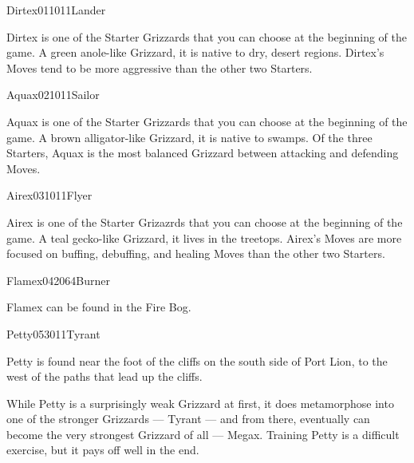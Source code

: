 \documentclass[10pt,twocolumn]{memoir}
\begin{document}
\begin{grizzardpage}{Dirtex}{01}{10}{1}{1}{Lander}

  Dirtex  is one  of the  Starter  Grizzards that  you can  choose at  the
  beginning of the game. A green anole-like Grizzard, it is native to dry,
  desert regions. Dirtex's Moves tend to be more aggressive than the other
  two Starters.

\end{grizzardpage}

\begin{grizzardpage}{Aquax}{02}{10}{1}{1}{Sailor}

  Aquax  is one  of  the Starter  Grizzards  that you  can  choose at  the
  beginning of the game. A brown  alligator-like Grizzard, it is native to
  swamps.  Of the  three Starters,  Aquax  is the  most balanced  Grizzard
  between attacking and defending Moves.

\end{grizzardpage}

\begin{grizzardpage}{Airex}{03}{10}{1}{1}{Flyer}

Airex  is one  of  the Starter  Grizazrds  that you  can  choose at  the
beginning  of  the  game.  A  teal  gecko-like  Grizzard,  it  lives  in
the treetops. Airex's Moves are  more focused on buffing, debuffing, and
healing Moves than the other two Starters.
  
\end{grizzardpage}

\begin{grizzardpage}{Flamex}{04}{20}{6}{4}{Burner}

Flamex can be found in the Fire Bog.
  
\end{grizzardpage}

\begin{grizzardpage}{Petty}{05}{30}{1}{1}{Tyrant}

  Petty is found near  the foot of the cliffs on the  south side of Port
  Lion, to the west of the paths that lead up the cliffs.

  While  Petty  is  a  surprisingly  weak Grizzard  at  first,  it  does
  metamorphose into  one of the stronger  Grizzards — Tyrant —  and from
  there,  eventually  can become  the  very  strongest Grizzard  of  all
  — Megax. Training Petty is a  difficult exercise, but it pays off well
  in the end.

\end{grizzardpage}
\end{document}
